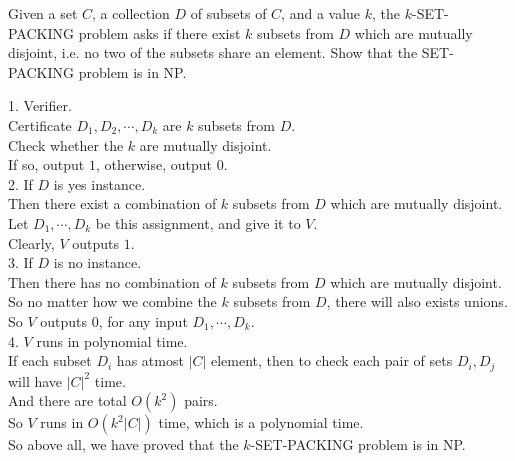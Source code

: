 \problem{}
Given a set $C$, a collection $D$ of subsets of $C$, and a value $k$, the $k$-SET-PACKING problem asks if there exist $k$ subsets from $D$ which are mutually disjoint, i.e. no two of the subsets share an element.  Show that the SET-PACKING problem is in NP.

\solution{}

1. Verifier. \\
Certificate $D_1,D_2,\cdots,D_k$ are $k$ subsets from $D$.\\
Check whether the $k$ are mutually disjoint.\\
If so, output $1$, otherwise, output $0$.\\

2. If $D$ is yes instance. \\
Then there exist a combination of $k$ subsets from $D$ which are mutually disjoint.\\
Let $D_1,\cdots,D_k$ be this assignment, and give it to $V$.\\
Clearly, $V$ outputs $1$.\\

3. If $D$ is no instance. \\
Then there has no combination of $k$ subsets from $D$ which are mutually disjoint.\\
So no matter how we combine the $k$ subsets from $D$, there will also exists unions.\\
So $V$ outputs $0$, for any input $D_1,\cdots,D_k$.\\

4. $V$ runs in polynomial time. \\
If each subset $D_i$ has atmost $|C|$ element, then to check each pair of sets $D_i,D_j$ will have $|C|^2$ time.\\
And there are total $O(k^2)$ pairs.\\
So $V$ runs in $O(k^2|C|)$ time, which is a polynomial time.\\

So above all, we have proved that the $k$-SET-PACKING problem is in NP.

\newpage
